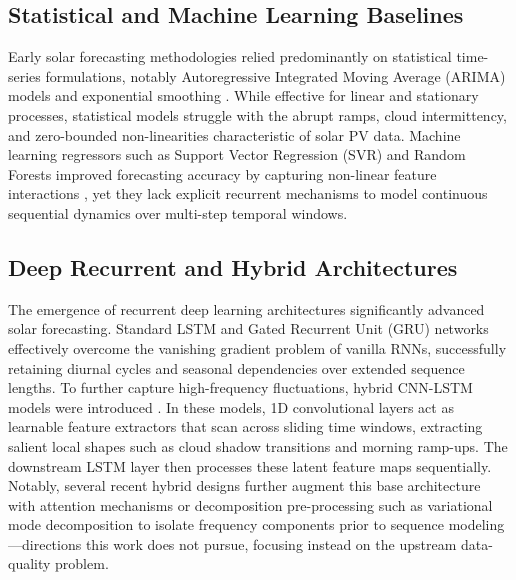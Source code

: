\documentclass[conference]{IEEEtran}
\begin{document}
\subsection{Statistical and Machine Learning Baselines}
Early solar forecasting methodologies relied predominantly on statistical time-series formulations, notably Autoregressive Integrated Moving Average (ARIMA) models and exponential smoothing \cite{sobri2018review, zhang2015baseline}. While effective for linear and stationary processes, statistical models struggle with the abrupt ramps, cloud intermittency, and zero-bounded non-linearities characteristic of solar PV data. Machine learning regressors such as Support Vector Regression (SVR) and Random Forests improved forecasting accuracy by capturing non-linear feature interactions \cite{abumohsen2024hybrid}, yet they lack explicit recurrent mechanisms to model continuous sequential dynamics over multi-step temporal windows.

\subsection{Deep Recurrent and Hybrid Architectures}
The emergence of recurrent deep learning architectures significantly advanced solar forecasting. Standard LSTM \cite{hochreiter1997lstm} and Gated Recurrent Unit (GRU) networks effectively overcome the vanishing gradient problem of vanilla RNNs, successfully retaining diurnal cycles and seasonal dependencies over extended sequence lengths. To further capture high-frequency fluctuations, hybrid CNN-LSTM models were introduced \cite{zang2020cnnlstm, obiora2021hourly, qu2021dayahead, boucetta2024enhanced, zhou2024enhancing}. In these models, 1D convolutional layers act as learnable feature extractors that scan across sliding time windows, extracting salient local shapes such as cloud shadow transitions and morning ramp-ups. The downstream LSTM layer then processes these latent feature maps sequentially. Notably, several recent hybrid designs further augment this base architecture with attention mechanisms \cite{qu2021dayahead, zhou2024enhancing} or decomposition pre-processing such as variational mode decomposition \cite{boucetta2024enhanced} to isolate frequency components prior to sequence modeling---directions this work does not pursue, focusing instead on the upstream data-quality problem.
\end{document}
